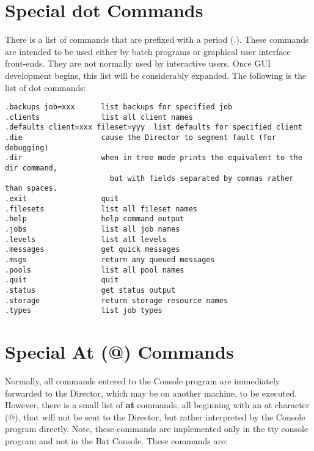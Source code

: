 \label{dotcommands}
\section{Special dot Commands}

There is a list of commands that are prefixed with a period (.). These
commands are intended to be used either by batch programs or graphical user
interface front-ends. They are not normally used by interactive users. Once
GUI development begins, this list will be considerably expanded. The following
is the list of dot commands: 

\footnotesize
\begin{verbatim}
.backups job=xxx      list backups for specified job
.clients              list all client names
.defaults client=xxx fileset=yyy  list defaults for specified client
.die                  cause the Director to segment fault (for debugging)
.dir                  when in tree mode prints the equivalent to the dir command,
                        but with fields separated by commas rather than spaces.
.exit                 quit
.filesets             list all fileset names
.help                 help command output
.jobs                 list all job names
.levels               list all levels
.messages             get quick messages
.msgs                 return any queued messages
.pools                list all pool names
.quit                 quit
.status               get status output
.storage              return storage resource names
.types                list job types
\end{verbatim}
\normalsize

\label{atcommands}

\section{Special At (@) Commands}

Normally, all commands entered to the Console program are immediately
forwarded to the Director, which may be on another machine, to be executed.
However, there is a small list of {\bf at} commands, all beginning with an at
character (@), that will not be sent to the Director, but rather interpreted
by the Console program directly. Note, these commands are implemented only in
the tty console program and not in the Bat Console. These commands are: 

